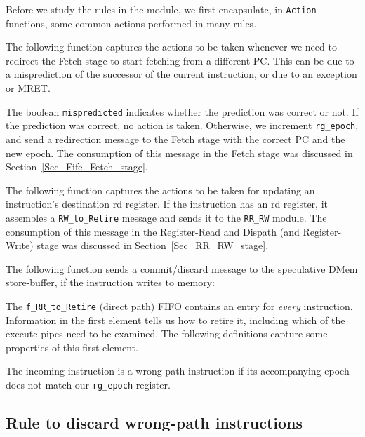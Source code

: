 Before we study the rules in the module, we first encapsulate, in
\verb|Action| functions, some common actions performed in many rules.

The following function captures the actions to be taken whenever we
need to redirect the Fetch stage to start fetching from a different
PC.  This can be due to a misprediction of the successor of the
current instruction, or due to an exception or MRET.



The boolean \verb|mispredicted| indicates whether the prediction was
correct or not.  If the prediction was correct, no action is taken.
Otherwise, we increment \verb|rg_epoch|, and send a redirection
message to the Fetch stage with the correct PC and the new epoch.  The
consumption of this message in the Fetch stage was discussed in
Section~\ref{Sec_Fife_Fetch_stage}.

The following function captures the actions to be taken for updating
an instruction's destination rd register. If the instruction has an rd
register, it assembles a \verb|RW_to_Retire| message and sends it to
the \verb|RR_RW| module.  The consumption of this message in the
Register-Read and Dispath (and Register-Write) stage was discussed in
Section~\ref{Sec_RR_RW_stage}.



The following function sends a commit/discard message to the
speculative DMem store-buffer, if the instruction writes to memory:



The \verb|f_RR_to_Retire| (direct path) FIFO contains an entry for
\emph{every} instruction.  Information in the first element tells us
how to retire it, including which of the execute pipes need to be
examined.  The following definitions capture some properties of this
first element.



The incoming instruction is a wrong-path instruction if its
accompanying epoch does not match our \verb|rg_epoch| register.


\subsection{Rule to discard wrong-path instructions}

